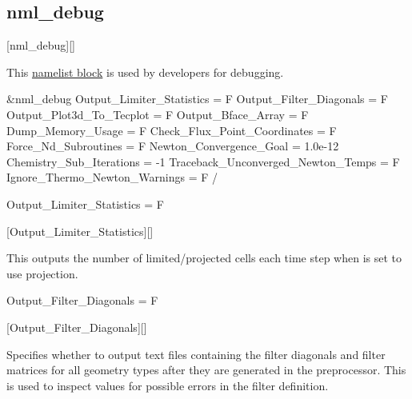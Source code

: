 \subsection{nml\_debug}
\label{SEC:nml_debug}
\inp*[nmlDebug]{}[nml\_debug][]

This \hyperref[SEC:User_Input]{namelist block}
is used by developers for debugging.

\begin{nmlblocklst}[
,label={LST:nml_debug}
,caption={Namelist nml\_debug.}
]
&nml_debug
  Output_Limiter_Statistics          = F
  Output_Filter_Diagonals            = F
  Output_Plot3d_To_Tecplot           = F
  Output_Bface_Array                 = F
  Dump_Memory_Usage                  = F
  Check_Flux_Point_Coordinates       = F
  Force_Nd_Subroutines               = F
  Newton_Convergence_Goal            = 1.0e-12
  Chemistry_Sub_Iterations           = -1
  Traceback_Unconverged_Newton_Temps = F
  Ignore_Thermo_Newton_Warnings      = F
/
\end{nmlblocklst}


\begin{nmldescitem}
Output_Limiter_Statistics = F
\end{nmldescitem}
[Output\_Limiter\_Statistics][]

\begin{nmldescbody}
This outputs the number of limited\slash projected cells each time step when
 is set to use
projection.
\end{nmldescbody}


\begin{nmldescitem}
Output_Filter_Diagonals = F
\end{nmldescitem}
[Output\_Filter\_Diagonals][]

\begin{nmldescbody}
Specifies whether to output text files containing the filter diagonals and
filter matrices for all geometry types after they are generated in the
preprocessor.
%
This is used to inspect values for possible errors in the filter
definition.
\end{nmldescbody}


